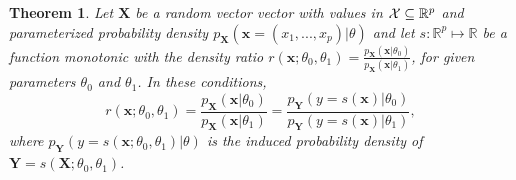 \documentclass[12pt]{article}
\numberwithin{equation}{section}
\theoremstyle{plain}
\newtheorem{theorem}{Theorem}
\begin{document}
\begin{theorem}
    \label{thm:ratio-equivalence}
    Let $\mathbf{X}$ be a random vector vector with values in ${\cal X} \subseteq \mathbb{R}^p$ and parameterized probability
    density $p_{\mathbf{X}}(\mathbf{x} = (x_1, ..., x_p)|\theta)$ and let
    $s : \mathbb{R}^p \mapsto \mathbb{R}$ be a function monotonic with the density ratio
    $r(\mathbf{x};\theta_0,\theta_1) = \frac{p_\mathbf{X}(\mathbf{x}|\theta_0)}{p_\mathbf{X}(\mathbf{x}|\theta_1)}$,
    for given parameters $\theta_0$ and $\theta_1$. In these conditions,
    \begin{equation}
        r(\mathbf{x};\theta_0,\theta_1) = \frac{p_\mathbf{X}(\mathbf{x}|\theta_0)}{p_\mathbf{X}(\mathbf{x}|\theta_1)} = \frac{p_\mathbf{Y}(y=s(\mathbf{x})|\theta_0)}{p_\mathbf{Y}(y=s(\mathbf{x})|\theta_1)},
    \end{equation}
    where $p_\mathbf{Y}(y=s(\mathbf{x};\theta_0,\theta_1)|\theta)$ is the induced probability density of
    $\mathbf{Y} = s(\mathbf{X};\theta_0,\theta_1)$.
\end{theorem}
\end{document}
